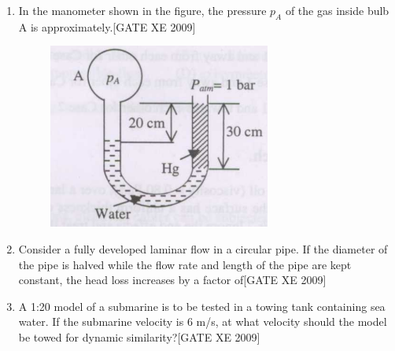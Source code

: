 \documentclass[journal,12pt,onecolumn]{IEEEtran}
\theoremstyle{remark}
\begin{document}
\begin{enumerate}
\item In the manometer shown in the figure, the pressure $p_A$ of the gas inside bulb A is approximately.\hfill[GATE XE 2009]
\begin{figure}[H]
    \centering
    \includegraphics[width=0.5\linewidth]{figs/fig3.png}
    \caption{}
    \label{fig:Q 26}
\end{figure}

\begin{enumerate}
\end{enumerate}



\item Consider a fully developed laminar flow in a circular pipe. If the diameter of the pipe is halved while the flow rate and length of the pipe are kept constant, the head loss increases by a factor of\hfill[GATE XE 2009]

\begin{enumerate}
\end{enumerate}



\item A 1:20 model of a submarine is to be tested in a towing tank containing sea water. If the submarine velocity is 6 m/s, at what velocity should the model be towed for dynamic similarity?\hfill[GATE XE 2009]

\begin{enumerate}
\end{enumerate}




\end{enumerate}
\end{document}
